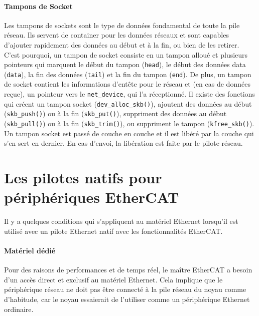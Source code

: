 \documentclass[a4paper,12pt,BCOR6mm,bibtotoc,idxtotoc]{scrbook}
\begin{document}
\paragraph{Tampons de Socket} Les tampons de sockets
sont le type de donn\'ees fondamental de toute la pile r\'eseau.  Ils
servent de container pour les donn\'ees r\'eseaux et sont capables
d'ajouter rapidement des donn\'ees au d\'ebut et \`a la fin, ou bien
de les retirer. C'est pourquoi, un tampon de socket consiste en un
tampon allou\'e et plusieurs pointeurs qui marquent le d\'ebut du
tampon (\lstinline+head+), le d\'ebut des donn\'ees data
(\lstinline+data+), la fin des donn\'ees (\lstinline+tail+) et la fin
du tampon (\lstinline+end+). De plus, un tampon de socket contient les
informations d'ent\^ete pour le r\'eseau et (en cas de donn\'ees
re\c{c}ue), un pointeur vers le \lstinline+net_device+, qui l'a
r\'eceptionn\'e.  Il existe des fonctions qui cr\'eent un tampon
socket (\lstinline+dev_alloc_skb()+), ajoutent des donn\'ees au
d\'ebut (\lstinline+skb_push()+) ou \`a la fin
(\lstinline+skb_put()+), suppriment des donn\'ees au d\'ebut
(\lstinline+skb_pull()+) ou \`a la fin (\lstinline+skb_trim()+), ou
suppriment le tampon (\lstinline+kfree_skb()+).  Un tampon socket est
pass\'e de couche en couche et il est lib\'er\'e par la couche qui
s'en sert en dernier. En cas d'envoi, la lib\'eration est faite par le
pilote r\'eseau.


\section{Les pilotes natifs pour p\'eriph\'eriques EtherCAT}
\label{sec:native-drivers}

Il y a quelques conditions qui s'appliquent au mat\'eriel Ethernet
lorsqu'il est utilis\'e avec un pilote Ethernet natif avec les
fonctionnalit\'es EtherCAT.

\paragraph{Mat\'eriel d\'edi\'e} Pour des raisons de performances et
de temps r\'eel, le ma\^itre EtherCAT a besoin d'un acc\`es direct et
exclusif au mat\'eriel Ethernet. Cela implique que le p\'eriph\'erique
r\'eseau ne doit pas \^etre connect\'e \`a la pile r\'eseau du noyau
comme d'habitude, car le noyau essaierait de l'utiliser comme un
p\'eriph\'erique Ethernet ordinaire.
\end{document}
